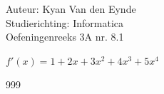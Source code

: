 \documentclass[a4paper]{article}
\begin{document}
  
\noindent \large Auteur: Kyan Van den Eynde \\
\noindent \large Studierichting: Informatica\\
\noindent \large Oefeningenreeks 3A nr. 8.1\\

\medskip

\normalsize

$f'(x) = 1 + 2x + 3x^2 +4x^3 + 5x^4$\\

\begin{thebibliography}{999}
\end{thebibliography}
\end{document}
